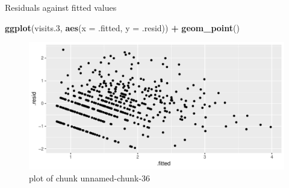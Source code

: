 \documentclass[ignorenonframetext,]{beamer}
\newenvironment{Shaded}{\begin{snugshade}}{\end{snugshade}}
\newcommand{\DataTypeTok}[1]{\textcolor[rgb]{0.13,0.29,0.53}{#1}}
\newcommand{\FloatTok}[1]{\textcolor[rgb]{0.00,0.00,0.81}{#1}}
\newcommand{\KeywordTok}[1]{\textcolor[rgb]{0.13,0.29,0.53}{\textbf{#1}}}
\newcommand{\NormalTok}[1]{#1}
\newcommand{\OperatorTok}[1]{\textcolor[rgb]{0.81,0.36,0.00}{\textbf{#1}}}
\newcommand{\StringTok}[1]{\textcolor[rgb]{0.31,0.60,0.02}{#1}}
\begin{document}
\begin{frame}[fragile]{Residuals against fitted values}
\protect\hypertarget{residuals-against-fitted-values}{}

\begin{Shaded}
\begin{Highlighting}[]
\KeywordTok{ggplot}\NormalTok{(visits}\FloatTok{.3}\NormalTok{, }\KeywordTok{aes}\NormalTok{(}\DataTypeTok{x =}\NormalTok{ .fitted, }\DataTypeTok{y =}\NormalTok{ .resid)) }\OperatorTok{+}
\StringTok{  }\KeywordTok{geom_point}\NormalTok{()}
\end{Highlighting}
\end{Shaded}

\begin{figure}
\centering
\includegraphics{figure/unnamed-chunk-36-1.pdf}
\caption{plot of chunk unnamed-chunk-36}
\end{figure}

\end{frame}
\end{document}
